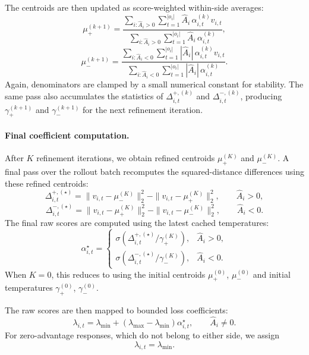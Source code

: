 \documentclass{llmxive}
\begin{document}
The centroids are then updated as score-weighted within-side averages:
\[
\mu_+^{(k+1)}
=
\frac{
\sum_{i:\hat A_i>0}\sum_{t=1}^{|o_i|}
\hat A_i\,\alpha_{i,t}^{(k)}v_{i,t}
}{
\sum_{i:\hat A_i>0}\sum_{t=1}^{|o_i|}
\hat A_i\,\alpha_{i,t}^{(k)}
},
\]
\[
\mu_-^{(k+1)}
=
\frac{
\sum_{i:\hat A_i<0}\sum_{t=1}^{|o_i|}
|\hat A_i|\,\alpha_{i,t}^{(k)}v_{i,t}
}{
\sum_{i:\hat A_i<0}\sum_{t=1}^{|o_i|}
|\hat A_i|\,\alpha_{i,t}^{(k)}
}.
\]
Again, denominators are clamped by a small numerical constant for stability.
The same pass also accumulates the statistics of \(\Delta_{i,t}^{+,(k)}\) and \(\Delta_{i,t}^{-,(k)}\), producing \(\gamma_+^{(k+1)}\) and \(\gamma_-^{(k+1)}\) for the next refinement iteration.

\paragraph{Final coefficient computation.}
After \(K\) refinement iterations, we obtain refined centroids \(\mu_+^{(K)}\) and \(\mu_-^{(K)}\).
A final pass over the rollout batch recomputes the squared-distance differences using these refined centroids:
\[
\Delta_{i,t}^{+,(\star)}
=
\|v_{i,t}-\mu_-^{(K)}\|_2^2
-
\|v_{i,t}-\mu_+^{(K)}\|_2^2,
\qquad \hat A_i>0,
\]
\[
\Delta_{i,t}^{-,(\star)}
=
\|v_{i,t}-\mu_+^{(K)}\|_2^2
-
\|v_{i,t}-\mu_-^{(K)}\|_2^2,
\qquad \hat A_i<0.
\]
The final raw scores are computed using the latest cached temperatures:
\[
\alpha_{i,t}^{\star}
=
\begin{cases}
\sigma\!\left(
\Delta_{i,t}^{+,(\star)}/\gamma_+^{(K)}
\right),
& \hat A_i>0,\\[1.0ex]
\sigma\!\left(
\Delta_{i,t}^{-,(\star)}/\gamma_-^{(K)}
\right),
& \hat A_i<0.
\end{cases}
\]
When \(K=0\), this reduces to using the initial centroids \(\mu_+^{(0)}\), \(\mu_-^{(0)}\) and initial temperatures \(\gamma_+^{(0)}\), \(\gamma_-^{(0)}\).

The raw scores are then mapped to bounded loss coefficients:
\[
\lambda_{i,t}
=
\lambda_{\min}
+
(\lambda_{\max}-\lambda_{\min})\alpha_{i,t}^{\star},
\qquad \hat A_i\ne 0.
\]
For zero-advantage responses, which do not belong to either side, we assign
\[
\lambda_{i,t}=\lambda_{\min}.
\]
\end{document}
